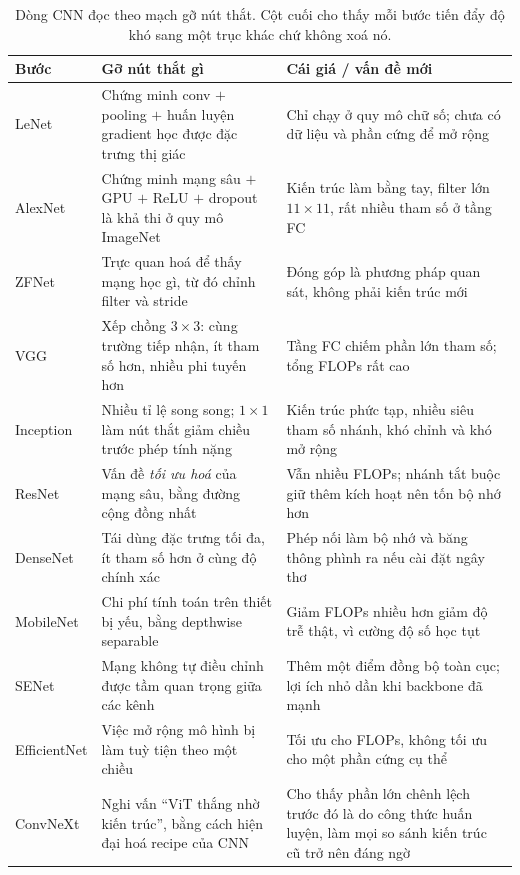 \documentclass[../../../deep_learning.tex]{subfiles}
\begin{document}
\begin{table}[H]\centering\footnotesize
\caption{Dòng CNN đọc theo mạch gỡ nút thắt. Cột cuối cho thấy mỗi bước tiến đẩy độ khó sang một trục khác chứ không xoá nó.}
\label{tab:dong-cnn}
\begin{tabularx}{\linewidth}{@{}L{1.95cm}YY@{}}
\toprule
\textbf{Bước} & \textbf{Gỡ nút thắt gì} & \textbf{Cái giá / vấn đề mới}\\
\midrule
LeNet & Chứng minh conv \(+\) pooling \(+\) huấn luyện gradient học được đặc trưng thị giác \cite{lecun1998gradient} & Chỉ chạy ở quy mô chữ số; chưa có dữ liệu và phần cứng để mở rộng\\
AlexNet & Chứng minh mạng sâu \(+\) GPU \(+\) ReLU \(+\) dropout là khả thi ở quy mô ImageNet \cite{krizhevsky2012alexnet} & Kiến trúc làm bằng tay, filter lớn \(11\times11\), rất nhiều tham số ở tầng FC\\
ZFNet & Trực quan hoá để thấy mạng học gì, từ đó chỉnh filter và stride & Đóng góp là phương pháp quan sát, không phải kiến trúc mới\\
VGG & Xếp chồng \(3\times3\): cùng trường tiếp nhận, ít tham số hơn, nhiều phi tuyến hơn \cite{simonyan2015vgg} & Tầng FC chiếm phần lớn tham số; tổng FLOPs rất cao\\
Inception & Nhiều tỉ lệ song song; \(1\times1\) làm nút thắt giảm chiều trước phép tính nặng \cite{szegedy2015going,szegedy2016rethinking} & Kiến trúc phức tạp, nhiều siêu tham số nhánh, khó chỉnh và khó mở rộng\\
ResNet & Vấn đề \emph{tối ưu hoá} của mạng sâu, bằng đường cộng đồng nhất \cite{he2016resnet} & Vẫn nhiều FLOPs; nhánh tắt buộc giữ thêm kích hoạt nên tốn bộ nhớ hơn\\
DenseNet & Tái dùng đặc trưng tối đa, ít tham số hơn ở cùng độ chính xác \cite{huang2017densenet} & Phép nối làm bộ nhớ và băng thông phình ra nếu cài đặt ngây thơ\\
MobileNet & Chi phí tính toán trên thiết bị yếu, bằng depthwise separable \cite{howard2017mobilenets} & Giảm FLOPs nhiều hơn giảm độ trễ thật, vì cường độ số học tụt\\
SENet & Mạng không tự điều chỉnh được tầm quan trọng giữa các kênh \cite{hu2018senet} & Thêm một điểm đồng bộ toàn cục; lợi ích nhỏ dần khi backbone đã mạnh\\
EfficientNet & Việc mở rộng mô hình bị làm tuỳ tiện theo một chiều \cite{tan2019efficientnet} & Tối ưu cho FLOPs, không tối ưu cho một phần cứng cụ thể\\
ConvNeXt & Nghi vấn ``ViT thắng nhờ kiến trúc'', bằng cách hiện đại hoá recipe của CNN \cite{liu2022convnext} & Cho thấy phần lớn chênh lệch trước đó là do công thức huấn luyện, làm mọi so sánh kiến trúc cũ trở nên đáng ngờ\\
\bottomrule
\end{tabularx}
\end{table}
\end{document}
